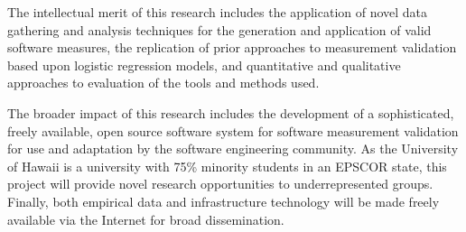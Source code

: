 The intellectual merit of this research includes the application of novel
data gathering and analysis techniques for the generation and application
of valid software measures, the replication of prior approaches to
measurement validation based upon logistic regression models, and
quantitative and qualitative approaches to evaluation of the tools and
methods used.  

The broader impact of this research includes the development of a
sophisticated, freely available, open source software system for software
measurement validation for use and adaptation by the software engineering
community. As the University of Hawaii is a university with 75\% minority
students in an EPSCOR state, this project will provide novel research
opportunities to underrepresented groups. Finally, both empirical data and
infrastructure technology will be made freely available via the Internet
for broad dissemination.


 







